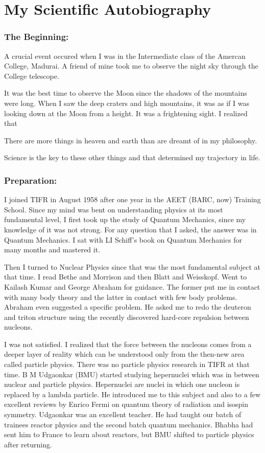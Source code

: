 \chapter{My Scientific Autobiography}

\subsection*{The Beginning:}

A crucial event occured when I was in the Intermediate class of the 
Amercan College, Madurai. A friend of mine took me to observe the night 
sky through the College telescope.


It was the best time to observe the Moon since the shadows of the 
mountains were long. When I saw the deep craters and high mountains, it 
was as if I was looking down at the Moon from a height. It was a 
frightening sight. I realized that


There are more things in heaven and earth than are dreamt of in my 
philosophy.


Science is the key to these other things and that determined my 
trajectory in life.

\subsection*{Preparation:}

I joined TIFR in August 1958 after one year in the AEET (BARC, now) 
Training School.  Since my mind was bent on understanding physics at its 
most fundamental level, I first took up the study of Quantum Mechanics, 
since my knowledge of it was not strong. For any question that I asked, 
the answer was in Quantum Mechanics. I sat with LI Schiff's book on 
Quantum Mechanics for many months and mastered it.

Then I turned to Nuclear Physics since that was the most fundamental 
subject at that time. I read Bethe and Morrison and then Blatt and 
Weisskopf. Went to Kailash Kumar and George Abraham for guidance. The 
former put me in contact with many body theory and the latter in contact 
with few body problems. Abraham even suggested a specific problem. He 
asked me to redo the deuteron and triton structure using the recently 
discovered hard-core repulsion between nucleons.

I was not satisfied. I realized that the force between the nucleons 
comes from a deeper layer of reality which can be understood only from 
the then-new area called particle physics. There was no particle physics 
research in TIFR at that time. B M Udgaonkar (BMU) started studying 
hepernuclei which was in between nuclear and particle physics. 
Hepernuclei are nuclei in which one nucleon is replaced by a lambda 
particle. He introduced me to this subject and also to a few excellent 
reviews by Enrico Fermi on quantum theory of radiation and isospin 
symmetry. Udgaonkar was an excellent teacher. He had taught our batch of 
trainees reactor physics and the second batch quantum mechanics. Bhabha 
had sent him to France to learn about reactors, but BMU shifted to 
particle physics after returning.


